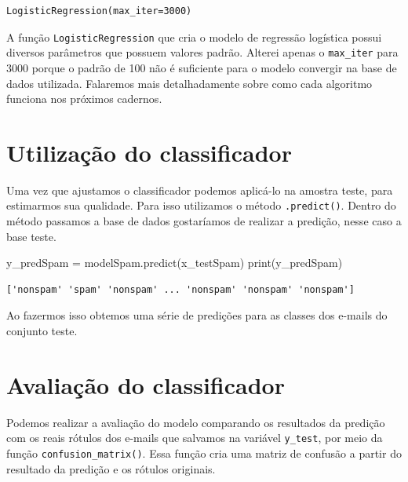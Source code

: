 \documentclass[
  letterpaper,
  DIV=11,
  numbers=noendperiod]{scrreprt}
\newenvironment{Shaded}{\begin{snugshade}}{\end{snugshade}}
\newcommand{\BuiltInTok}[1]{\textcolor[rgb]{0.00,0.23,0.31}{#1}}
\newcommand{\NormalTok}[1]{\textcolor[rgb]{0.00,0.23,0.31}{#1}}
\newcommand{\OperatorTok}[1]{\textcolor[rgb]{0.37,0.37,0.37}{#1}}
\begin{document}
\begin{verbatim}
LogisticRegression(max_iter=3000)
\end{verbatim}

A função \texttt{LogisticRegression} que cria o modelo de regressão
logística possui diversos parâmetros que possuem valores padrão. Alterei
apenas o \texttt{max\_iter} para 3000 porque o padrão de 100 não é
suficiente para o modelo convergir na base de dados utilizada. Falaremos
mais detalhadamente sobre como cada algoritmo funciona nos próximos
cadernos.

\hypertarget{utilizauxe7uxe3o-do-classificador}{%
\section{Utilização do
classificador}\label{utilizauxe7uxe3o-do-classificador}}

Uma vez que ajustamos o classificador podemos aplicá-lo na amostra
teste, para estimarmos sua qualidade. Para isso utilizamos o método
\texttt{.predict()}. Dentro do método passamos a base de dados
gostaríamos de realizar a predição, nesse caso a base teste.

\begin{Shaded}
\begin{Highlighting}[]
\NormalTok{y\_predSpam }\OperatorTok{=}\NormalTok{ modelSpam.predict(x\_testSpam)}
\BuiltInTok{print}\NormalTok{(y\_predSpam)}
\end{Highlighting}
\end{Shaded}

\begin{verbatim}
['nonspam' 'spam' 'nonspam' ... 'nonspam' 'nonspam' 'nonspam']
\end{verbatim}

Ao fazermos isso obtemos uma série de predições para as classes dos
e-mails do conjunto teste.

\hypertarget{avaliauxe7uxe3o-do-classificador}{%
\section{Avaliação do
classificador}\label{avaliauxe7uxe3o-do-classificador}}

Podemos realizar a avaliação do modelo comparando os resultados da
predição com os reais rótulos dos e-mails que salvamos na variável
\texttt{y\_test}, por meio da função \texttt{confusion\_matrix()}. Essa
função cria uma matriz de confusão a partir do resultado da predição e
os rótulos originais.
\end{document}
